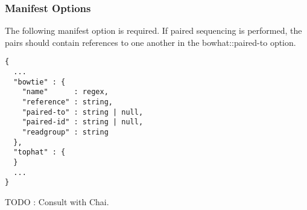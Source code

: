 \subsubsection{Manifest Options}
The following manifest option is required. If paired sequencing is performed, the pairs should contain references to one another in the bowhat::paired-to option.
\begin{verbatim}
{
  ...
  "bowtie" : {
    "name"      : regex,
    "reference" : string,
    "paired-to" : string | null,
    "paired-id" : string | null,
    "readgroup" : string
  },
  "tophat" : {
  }
  ...
}
\end{verbatim}
TODO : Consult with Chai.
